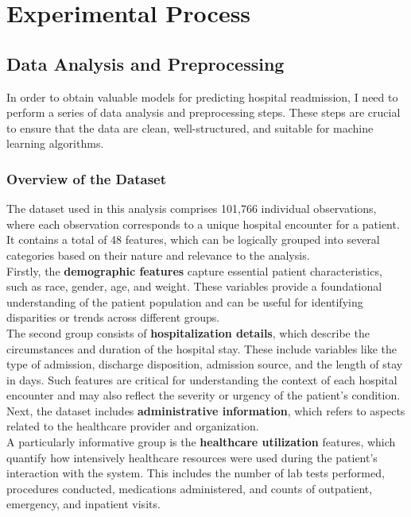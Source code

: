 \section{Experimental Process}

\subsection{Data Analysis and Preprocessing}
In order to obtain valuable models for predicting hospital readmission, I need to perform a series of data analysis and preprocessing steps. These steps are crucial to ensure that the data are clean, well-structured, and suitable for machine learning algorithms.
\subsubsection{Overview of the Dataset}
The dataset used in this analysis comprises 101,766 individual observations, where each observation corresponds to a unique hospital encounter for a patient. It contains a total of 48 features, which can be logically grouped into several categories based on their nature and relevance to the analysis.\\
Firstly, the \textbf{demographic features} capture essential patient characteristics, such as race, gender, age, and weight. These variables provide a foundational understanding of the patient population and can be useful for identifying disparities or trends across different groups.\\
The second group consists of \textbf{hospitalization details}, which describe the circumstances and duration of the hospital stay. These include variables like the type of admission, discharge disposition, admission source, and the length of stay in days. Such features are critical for understanding the context of each hospital encounter and may also reflect the severity or urgency of the patient's condition.\\
Next, the dataset includes \textbf{administrative information}, which refers to aspects related to the healthcare provider and organization.\\
A particularly informative group is the \textbf{healthcare utilization} features, which quantify how intensively healthcare resources were used during the patient's interaction with the system. This includes the number of lab tests performed, procedures conducted, medications administered, and counts of outpatient, emergency, and inpatient visits.\\
